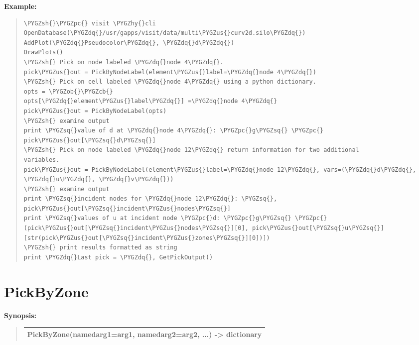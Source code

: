 \documentclass[letterpaper,10pt,english]{sphinxmanual}
\def\PYGZus{\char`\_}
\def\PYGZob{\char`\{}
\def\PYGZcb{\char`\}}
\def\PYGZsh{\char`\#}
\def\PYGZpc{\char`\%}
\def\PYGZhy{\char`\-}
\def\PYGZsq{\char`\'}
\def\PYGZdq{\char`\"}
\renewcommand\PYGZsq{\textquotesingle}
\begin{document}
\begin{DUlineblock}{0em}
\item[] \textbf{Example:}
\item[] 
\end{DUlineblock}
\begin{quote}

\begin{Verbatim}[commandchars=\\\{\}]
\PYGZsh{}\PYGZpc{} visit \PYGZhy{}cli
OpenDatabase(\PYGZdq{}/usr/gapps/visit/data/multi\PYGZus{}curv2d.silo\PYGZdq{})
AddPlot(\PYGZdq{}Pseudocolor\PYGZdq{}, \PYGZdq{}d\PYGZdq{})
DrawPlots()
\PYGZsh{} Pick on node labeled \PYGZdq{}node 4\PYGZdq{}.
pick\PYGZus{}out = PickByNodeLabel(element\PYGZus{}label=\PYGZdq{}node 4\PYGZdq{})
\PYGZsh{} Pick on cell labeled \PYGZdq{}node 4\PYGZdq{} using a python dictionary.
opts = \PYGZob{}\PYGZcb{}
opts[\PYGZdq{}element\PYGZus{}label\PYGZdq{}] =\PYGZdq{}node 4\PYGZdq{}
pick\PYGZus{}out = PickByNodeLabel(opts)
\PYGZsh{} examine output
print \PYGZsq{}value of d at \PYGZdq{}node 4\PYGZdq{}: \PYGZpc{}g\PYGZsq{} \PYGZpc{} pick\PYGZus{}out[\PYGZsq{}d\PYGZsq{}]
\PYGZsh{} Pick on node labeled \PYGZdq{}node 12\PYGZdq{} return information for two additional
variables.
pick\PYGZus{}out = PickByNodeLabel(element\PYGZus{}label=\PYGZdq{}node 12\PYGZdq{}, vars=(\PYGZdq{}d\PYGZdq{}, \PYGZdq{}u\PYGZdq{}, \PYGZdq{}v\PYGZdq{}))
\PYGZsh{} examine output
print \PYGZsq{}incident nodes for \PYGZdq{}node 12\PYGZdq{}: \PYGZsq{}, pick\PYGZus{}out[\PYGZsq{}incident\PYGZus{}nodes\PYGZsq{}]
print \PYGZsq{}values of u at incident node \PYGZpc{}d: \PYGZpc{}g\PYGZsq{} \PYGZpc{} (pick\PYGZus{}out[\PYGZsq{}incident\PYGZus{}nodes\PYGZsq{}][0], pick\PYGZus{}out[\PYGZsq{}u\PYGZsq{}][str(pick\PYGZus{}out[\PYGZsq{}incident\PYGZus{}zones\PYGZsq{}][0])])
\PYGZsh{} print results formatted as string
print \PYGZdq{}Last pick = \PYGZdq{}, GetPickOutput()
\end{Verbatim}
\end{quote}


\section{PickByZone}
\label{functions:pickbyzone}
\begin{DUlineblock}{0em}
\item[] \textbf{Synopsis:}
\end{DUlineblock}
\begin{quote}

\begin{tabulary}{\linewidth}{|L|}
\hline

PickByZone(namedarg1=arg1, namedarg2=arg2, ...) -\textgreater{} dictionary
\\
\hline\end{tabulary}

\end{quote}
\end{document}
